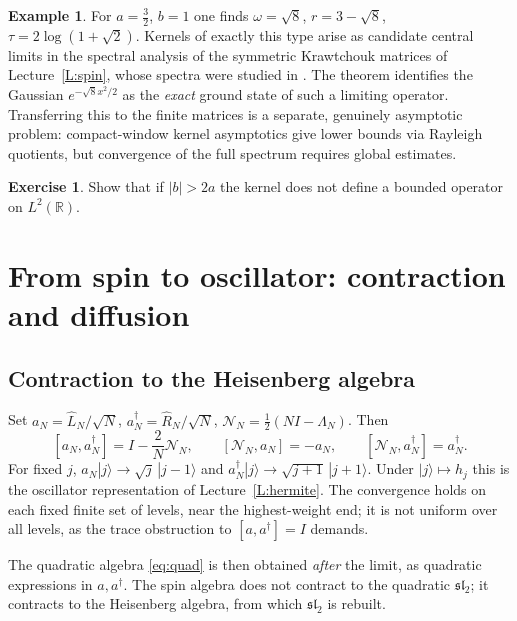 \documentclass[11pt,reqno]{amsart}
\theoremstyle{definition}
\newtheorem{example}[theorem]{Example}
\newtheorem{exercise}[theorem]{Exercise}
\theoremstyle{remark}
\newcommand{\R}{\mathbb R}
\newcommand{\NN}{\mathcal N}
\newcommand{\Id}{I}
\begin{document}
\begin{example}\label{ex:sqrt8}
For $a=\frac32$, $b=1$ one finds $\omega=\sqrt8$, $r=3-\sqrt8$,
$\tau=2\log(1+\sqrt2)$. Kernels of exactly this type arise as candidate
central limits in the spectral analysis of the symmetric Krawtchouk
matrices of Lecture~\ref{L:spin}, whose spectra were studied in
\cite{FeinsilverFitzgerald1996}. The theorem identifies the Gaussian
$e^{-\sqrt8x^2/2}$ as the \emph{exact} ground state of such a limiting
operator. Transferring this to the finite matrices is a separate,
genuinely asymptotic problem: compact-window kernel asymptotics give
lower bounds via Rayleigh quotients, but convergence of the full spectrum
requires global estimates.
\end{example}

\begin{exercise}
Show that if $|b|>2a$ the kernel does not define a bounded operator on
$L^2(\R)$.
\end{exercise}

\section{From spin to oscillator: contraction and diffusion}\label{L:limits}

\subsection{Contraction to the Heisenberg algebra}
Set $a_N=\widehat L_N/\sqrt N$, $a_N^\dagger=\widehat R_N/\sqrt N$,
$\NN_N=\frac12(N\Id-\Lambda_N)$. Then
\begin{equation}\label{eq:contr}
[a_N,a_N^\dagger]=\Id-\frac{2}{N}\NN_N,\qquad
[\NN_N,a_N]=-a_N,\qquad[\NN_N,a_N^\dagger]=a_N^\dagger.
\end{equation}
For fixed $j$, $a_N|j\rangle\to\sqrt j\,|j-1\rangle$ and
$a_N^\dagger|j\rangle\to\sqrt{j+1}\,|j+1\rangle$. Under $|j\rangle\mapsto h_j$
this is the oscillator representation of Lecture~\ref{L:hermite}. The
convergence holds on each fixed finite set of levels, near the
highest-weight end; it is not uniform over all levels, as the trace
obstruction to $[a,a^\dagger]=\Id$ demands.

The quadratic algebra \eqref{eq:quad} is then obtained \emph{after} the
limit, as quadratic expressions in $a,a^\dagger$. The spin algebra does
not contract to the quadratic $\mathfrak{sl}_2$; it contracts to the
Heisenberg algebra, from which $\mathfrak{sl}_2$ is rebuilt.
\end{document}

